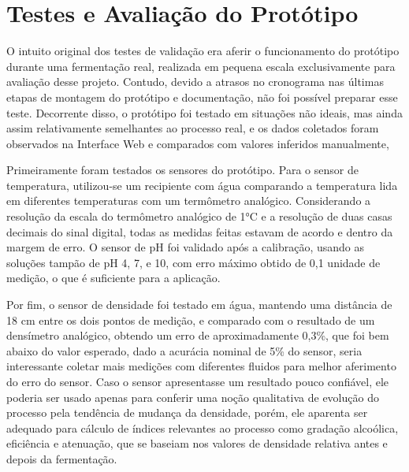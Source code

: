 \chapter{Testes e Avaliação do Protótipo}

O intuito original dos testes de validação era aferir o funcionamento do protótipo durante uma fermentação real, 
realizada em pequena escala exclusivamente para avaliação desse projeto. Contudo, devido a atrasos no cronograma
nas últimas etapas de montagem do protótipo e documentação, não foi possível preparar esse teste. Decorrente disso,
o protótipo foi testado em situações não ideais, mas ainda assim relativamente semelhantes ao processo real, e os
dados coletados foram observados na Interface Web e comparados com valores inferidos manualmente, 


Primeiramente foram testados os sensores do protótipo. Para o sensor de temperatura, utilizou-se um recipiente com água
comparando a temperatura lida em diferentes temperaturas com um termômetro analógico. Considerando a resolução da escala do
termômetro analógico de 1°C e a resolução de duas casas decimais do sinal digital, todas as medidas feitas estavam de acordo
e dentro da margem de erro. O sensor de pH foi validado após a calibração, usando as soluções tampão de pH 4, 7, e 10, com erro
máximo obtido de 0,1 unidade de medição, o que é suficiente para a aplicação. 

Por fim, o sensor de densidade foi testado em água,
mantendo uma distância de 18 cm entre os dois pontos de medição, e comparado com o resultado de um densímetro analógico,
obtendo um erro de aproximadamente 0,3\%, que foi bem abaixo do valor esperado, dado a acurácia nominal de 5\% do sensor, 
seria interessante coletar mais medições com diferentes fluidos para melhor aferimento do erro do sensor. Caso o sensor apresentasse
um resultado pouco confiável, ele poderia ser usado apenas para conferir uma noção qualitativa de evolução do processo pela 
tendência de mudança da densidade, porém, ele aparenta ser adequado para cálculo de índices relevantes ao processo como 
gradação alcoólica, eficiência e atenuação, que se baseiam nos valores de densidade relativa antes e depois da fermentação.

